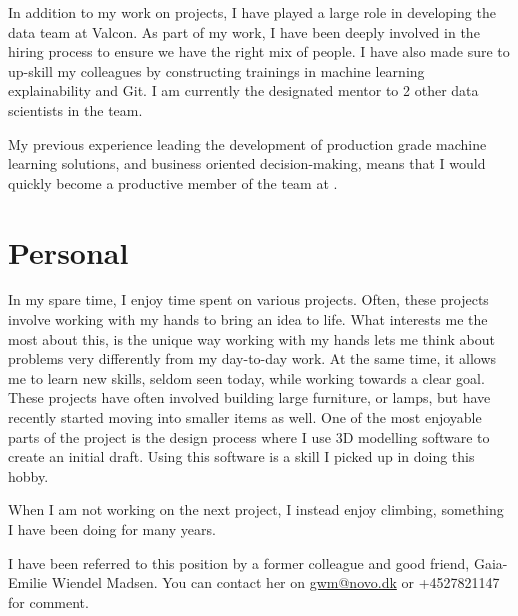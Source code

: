 \hspace{7 mm} In addition to my work on projects, I have played a large role in developing the data team at Valcon.
As part of my work, I have been deeply involved in the hiring process to ensure we have the right mix of people.
I have also made sure to up-skill my colleagues by constructing trainings in machine learning explainability and Git.
I am currently the designated mentor to 2 other data scientists in the team.

\hspace{7 mm} My previous experience leading the development of production grade machine learning solutions, and business oriented decision-making, means that I would quickly become a productive member of the team at \company{}.

\section{Personal}
In my spare time, I enjoy time spent on various projects.
Often, these projects involve working with my hands to bring an idea to life.
What interests me the most about this, is the unique way working with my hands lets me think about problems very differently from my day-to-day work.
At the same time, it allows me to learn new skills, seldom seen today, while working towards a clear goal.
These projects have often involved building large furniture, or lamps, but have recently started moving into smaller items as well.
One of the most enjoyable parts of the project is the design process where I use 3D modelling software to create an initial draft.
Using this software is a skill I picked up in doing this hobby.

\hspace{7 mm} When I am not working on the next project, I instead enjoy climbing, something I have been doing for many years.

\vspace{0.5 cm}
I have been referred to this position by a former colleague and good friend, Gaia-Emilie Wiendel Madsen.
You can contact her on \href{mailto:gwm@novo.dk}{gwm@novo.dk} or +4527821147 for comment.


